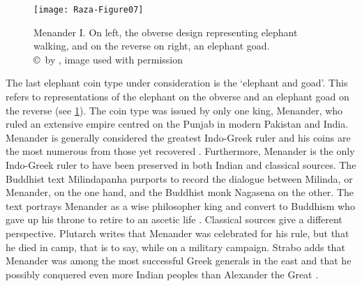 \documentclass{ijsra}
\begin{document}
\begin{figure}[!htb] %
	\centering
	\texttt{[image: Raza-Figure07]}
	\caption{Menander I. On left, the obverse design representing elephant walking, and on the reverse on right, an elephant goad.
		{\normalfont\scriptsize \\ \copyright\ by \cite{Coin}, image used with permission}}
	\label{fig:Raza-Figure07}
\end{figure}

The last elephant coin type under consideration is the ‘elephant and goad’.
This refers to representations of the elephant on the obverse and an elephant goad on the reverse (see \cref{fig:Raza-Figure07}). 
The coin type was issued by only one king, Menander, who ruled an extensive empire centred on the Punjab in modern Pakistan and India. 
Menander is generally considered the greatest Indo-Greek ruler and his coins are the most numerous from those yet recovered \parencite[14--17]{Bopearachchi1993}.
Furthermore, Menander is the only Indo-Greek ruler to have been preserved in both Indian and classical sources. 
The Buddhist text Milindapanha purports to record the dialogue between Milinda, or Menander, on the one hand,
and the Buddhist monk Nagasena on the other. 
The text portrays Menander as a wise philosopher king and convert to Buddhism who gave up his throne to retire to an ascetic life
\parencite[14--17]{Bopearachchi1993}. 
Classical sources give a different perspective.
Plutarch writes that Menander was celebrated for his rule, but that he died in camp, that is to say, while on a military campaign. 
Strabo adds that Menander was among the most successful Greek generals in the east and that he possibly conquered even more
Indian peoples than Alexander the Great \parencite[180, 183]{Holt1999}.
\end{document}
